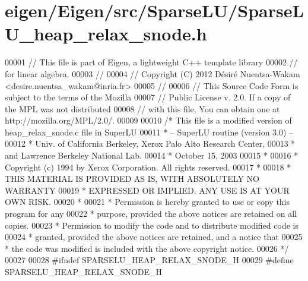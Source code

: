 \hypertarget{eigen_2_eigen_2src_2_sparse_l_u_2_sparse_l_u__heap__relax__snode_8h_source}{}\section{eigen/\+Eigen/src/\+Sparse\+L\+U/\+Sparse\+L\+U\+\_\+heap\+\_\+relax\+\_\+snode.h}
\label{eigen_2_eigen_2src_2_sparse_l_u_2_sparse_l_u__heap__relax__snode_8h_source}

\begin{DoxyCode}
00001 \textcolor{comment}{// This file is part of Eigen, a lightweight C++ template library}
00002 \textcolor{comment}{// for linear algebra.}
00003 \textcolor{comment}{//}
00004 \textcolor{comment}{// Copyright (C) 2012 Désiré Nuentsa-Wakam <desire.nuentsa\_wakam@inria.fr>}
00005 \textcolor{comment}{//}
00006 \textcolor{comment}{// This Source Code Form is subject to the terms of the Mozilla}
00007 \textcolor{comment}{// Public License v. 2.0. If a copy of the MPL was not distributed}
00008 \textcolor{comment}{// with this file, You can obtain one at http://mozilla.org/MPL/2.0/.}
00009 
00010 \textcolor{comment}{/* This file is a modified version of heap\_relax\_snode.c file in SuperLU}
00011 \textcolor{comment}{ * -- SuperLU routine (version 3.0) --}
00012 \textcolor{comment}{ * Univ. of California Berkeley, Xerox Palo Alto Research Center,}
00013 \textcolor{comment}{ * and Lawrence Berkeley National Lab.}
00014 \textcolor{comment}{ * October 15, 2003}
00015 \textcolor{comment}{ *}
00016 \textcolor{comment}{ * Copyright (c) 1994 by Xerox Corporation.  All rights reserved.}
00017 \textcolor{comment}{ *}
00018 \textcolor{comment}{ * THIS MATERIAL IS PROVIDED AS IS, WITH ABSOLUTELY NO WARRANTY}
00019 \textcolor{comment}{ * EXPRESSED OR IMPLIED.  ANY USE IS AT YOUR OWN RISK.}
00020 \textcolor{comment}{ *}
00021 \textcolor{comment}{ * Permission is hereby granted to use or copy this program for any}
00022 \textcolor{comment}{ * purpose, provided the above notices are retained on all copies.}
00023 \textcolor{comment}{ * Permission to modify the code and to distribute modified code is}
00024 \textcolor{comment}{ * granted, provided the above notices are retained, and a notice that}
00025 \textcolor{comment}{ * the code was modified is included with the above copyright notice.}
00026 \textcolor{comment}{ */}
00027 
00028 \textcolor{preprocessor}{#ifndef SPARSELU\_HEAP\_RELAX\_SNODE\_H}
00029 \textcolor{preprocessor}{#define SPARSELU\_HEAP\_RELAX\_SNODE\_H}

\end{DoxyCode}
